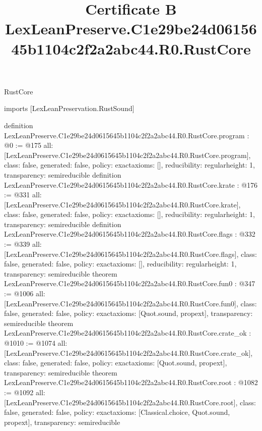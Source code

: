 \begin{lexlean}{RustCore}
\title{Certificate B LexLeanPreserve.C1e29be24d0615645b1104c2f2a2abc44.R0.RustCore}
\begin{coremodule}
imports [LexLeanPreservation.RustSound]

definition LexLeanPreserve.C1e29be24d0615645b1104c2f2a2abc44.R0.RustCore.program : @0 := @175 {
  all: [LexLeanPreserve.C1e29be24d0615645b1104c2f2a2abc44.R0.RustCore.program],
  class: false,
  generated: false,
  policy: exact{axioms: []},
  reducibility: regular{height: 1},
  transparency: semireducible
}
definition LexLeanPreserve.C1e29be24d0615645b1104c2f2a2abc44.R0.RustCore.krate : @176 := @331 {
  all: [LexLeanPreserve.C1e29be24d0615645b1104c2f2a2abc44.R0.RustCore.krate],
  class: false,
  generated: false,
  policy: exact{axioms: []},
  reducibility: regular{height: 1},
  transparency: semireducible
}
definition LexLeanPreserve.C1e29be24d0615645b1104c2f2a2abc44.R0.RustCore.flags : @332 := @339 {
  all: [LexLeanPreserve.C1e29be24d0615645b1104c2f2a2abc44.R0.RustCore.flags],
  class: false,
  generated: false,
  policy: exact{axioms: []},
  reducibility: regular{height: 1},
  transparency: semireducible
}
theorem LexLeanPreserve.C1e29be24d0615645b1104c2f2a2abc44.R0.RustCore.fun0 : @347 := @1006 {
  all: [LexLeanPreserve.C1e29be24d0615645b1104c2f2a2abc44.R0.RustCore.fun0],
  class: false,
  generated: false,
  policy: exact{axioms: [Quot.sound, propext]},
  transparency: semireducible
}
theorem LexLeanPreserve.C1e29be24d0615645b1104c2f2a2abc44.R0.RustCore.crate_ok : @1010 := @1074 {
  all: [LexLeanPreserve.C1e29be24d0615645b1104c2f2a2abc44.R0.RustCore.crate_ok],
  class: false,
  generated: false,
  policy: exact{axioms: [Quot.sound, propext]},
  transparency: semireducible
}
theorem LexLeanPreserve.C1e29be24d0615645b1104c2f2a2abc44.R0.RustCore.root : @1082 := @1092 {
  all: [LexLeanPreserve.C1e29be24d0615645b1104c2f2a2abc44.R0.RustCore.root],
  class: false,
  generated: false,
  policy: exact{axioms: [Classical.choice, Quot.sound, propext]},
  transparency: semireducible
}


\end{coremodule}
\end{lexlean}
